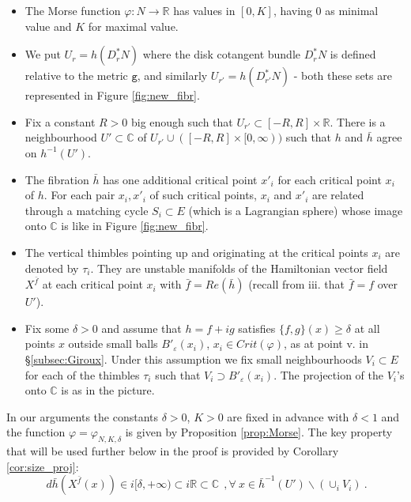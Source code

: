 \begin{itemize}
\item[a.] The Morse function $\varphi: N\to \mathbb{R}$ has values in $[0,K]$, having $0$ as minimal value and $K$ for maximal value. 
\item[b.]  We put $U_{r}=h(D_{r}^{\ast}N)$  where the disk cotangent bundle  $D_{r}^{\ast}N$ is defined relative to the metric $\texttt{g}$, and 
similarly $U_{r'}=h(D_{r'}^{\ast}N)$ - both these sets are represented in Figure \ref{fig:new_fibr}.
\item[c.]  Fix a constant $R>0$ big enough such that $U_{r'}\subset [-R,R]\times\mathbb{R}$. There is a neighbourhood $U'\subset \mathbb{C}$ of $U_{r'}\cup ([-R, R]\times [0,\infty))$ such that $h$  and  $\bar{h}$ agree on $h^{-1}(U')$.
\item[d.] The fibration $\bar{h}$ has one additional critical point $x'_{i}$ for 
each critical point $x_{i}$ of $h$. For each pair $x_{i}, x'_{i}$ of such critical points, $x_{i}$ and $x'_{i}$ are related through a matching cycle $S_{i}\subset E$ (which is a Lagrangian sphere) whose image onto $\mathbb{C}$ is like in Figure \ref{fig:new_fibr}. 
\item[e.] The vertical thimbles pointing up and originating at the critical points 
$x_{i}$ are denoted by $\tau_{i}$. They are unstable manifolds of the Hamiltonian vector field $X^{\bar{f}}$ at each critical point $x_{i}$ with $\bar{f}= Re (\bar{h})$ (recall from iii. that $\bar{f}= f$ over $U'$).
\item[f.] Fix some $\delta >0$ and assume that $h= f+i g$ satisfies $\{f,g\}(x)\geq \delta$ at all points $x$ outside
small balls $B'_{\varepsilon}(x_{i})$, $x_{i}\in Crit(\varphi)$, as at point v. in \S\ref{subsec:Giroux}. Under this assumption we fix small neighbourhoods $V_{i}\subset E$  for each of the thimbles $\tau_{i}$ such that $V_{i}\supset B'_{\varepsilon}(x_{i})$. The projection of the $V_{i}$'s onto $\mathbb{C}$ is as in the picture. 
\end{itemize}
In our arguments the constants $\delta>0$, $K>0$ are fixed in advance with 
$\delta < 1$ and the function $\varphi=\varphi_{N,K,\delta}$ is given  by Proposition \ref{prop:Morse}. The key property that will be used further below in the proof is provided by Corollary \ref{cor:size_proj}: 
\begin{equation}\label{eq:Ham_big}
 \ \  d\bar{h}(X^{\bar{f}}(x))\in i [\delta,+\infty) \subset  i\mathbb{R}\subset \mathbb{C}\ \   , \forall\ x\in \bar{h}^{-1}(U')\backslash (\cup_{i} V_{i}) ~.~
 \end{equation} 
 
